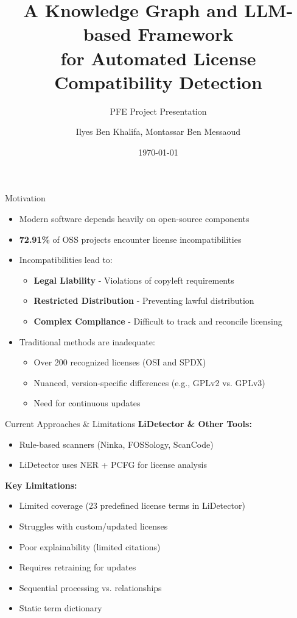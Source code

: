 \documentclass{beamer}
\title{A Knowledge Graph and LLM-based Framework \\ for Automated License Compatibility Detection}
\subtitle{PFE Project Presentation}
\author{Ilyes Ben Khalifa, Montassar Ben Messaoud}
\institute{Tunis Business School, Mourouj 3, Tunisia}
\date{\today}
\begin{document}
\begin{frame}
\titlepage
\end{frame}

\begin{frame}{Motivation}
\begin{itemize}
\item Modern software depends heavily on open-source components
\item \textbf{72.91\%} of OSS projects encounter license incompatibilities
\item Incompatibilities lead to:
    \begin{itemize}
    \item \textbf{Legal Liability} - Violations of copyleft requirements
    \item \textbf{Restricted Distribution} - Preventing lawful distribution
    \item \textbf{Complex Compliance} - Difficult to track and reconcile licensing
    \end{itemize}
\item Traditional methods are inadequate:
    \begin{itemize}
    \item Over 200 recognized licenses (OSI and SPDX)
    \item Nuanced, version-specific differences (e.g., GPLv2 vs. GPLv3)
    \item Need for continuous updates
    \end{itemize}
\end{itemize}
\end{frame}

\begin{frame}{Current Approaches \& Limitations}
\textbf{LiDetector \& Other Tools:}
\begin{itemize}
\item Rule-based scanners (Ninka, FOSSology, ScanCode)
\item LiDetector uses NER + PCFG for license analysis
\end{itemize}

\textbf{Key Limitations:}
\begin{itemize}
\item Limited coverage (23 predefined license terms in LiDetector)
\item Struggles with custom/updated licenses
\item Poor explainability (limited citations)
\item Requires retraining for updates
\item Sequential processing vs. relationships
\item Static term dictionary
\end{itemize}
\end{frame}
\end{document}
